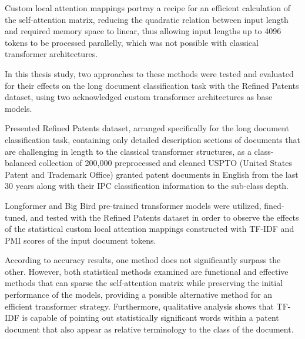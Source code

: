 \documentclass{iyte}
\begin{document}
Custom local attention mappings portray a recipe for an efficient calculation of the self-attention matrix, reducing the quadratic relation between input length and required memory space to linear, thus allowing input lengths up to 4096 tokens to be processed parallelly, which was not possible with classical transformer architectures. 

In this thesis study, two approaches to these methods were tested and evaluated for their effects on the long document classification task with the Refined Patents dataset, using two acknowledged custom transformer architectures as base models.

Presented Refined Patents dataset, arranged specifically for the long document classification task, containing only detailed description sections of documents that are challenging in length to the classical transformer structures, as a class-balanced collection of 200,000 preprocessed and cleaned USPTO (United States Patent and Trademark Office) granted patent documents in English from the last 30 years along with their IPC classification information to the sub-class depth.

Longformer and Big Bird pre-trained transformer models were utilized, fined-tuned, and tested with the Refined Patents dataset in order to observe the effects of the statistical custom local attention mappings constructed with TF-IDF and PMI scores of the input document tokens.
 
According to accuracy results, one method does not significantly surpass the other. However, both statistical methods examined are functional and effective methods that can sparse the self-attention matrix while preserving the initial performance of the models, providing a possible alternative method for an efficient transformer strategy. Furthermore, qualitative analysis shows that TF-IDF is capable of pointing out statistically significant words within a patent document that also appear as relative terminology to the class of the document.
\end{document}
